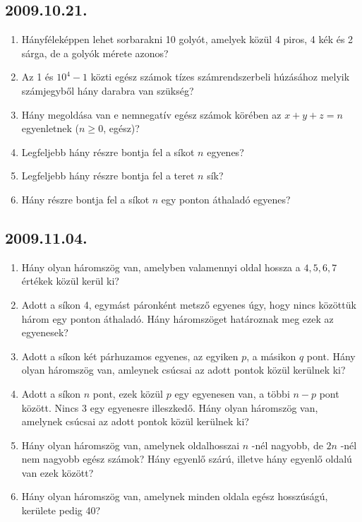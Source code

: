 \documentclass{article}
\begin{document}
\subsection*{2009.10.21.}
\begin{enumerate}
\item Hányféleképpen lehet sorbarakni 10 golyót, amelyek közül 4 piros, 4 kék és 2 sárga, de a golyók mérete azonos?
\item Az 1 és $10^4-1$ közti egész számok tízes számrendszerbeli húzásához melyik számjegyből hány darabra van szükség?
\item Hány megoldása van e nemnegatív egész számok körében az $x+y+z=n$ egyenletnek ($n\geq 0$, egész)?
\item Legfeljebb hány részre bontja fel a síkot $n$ egyenes?
\item Legfeljebb hány részre bontja fel a teret $n$ sík?
\item Hány részre bontja fel a síkot $n$ egy ponton áthaladó egyenes?
\end{enumerate}

\subsection*{2009.11.04.}
\begin{enumerate}
\item Hány olyan háromszög van, amelyben valamennyi oldal hossza a $4,5,6,7$ értékek közül kerül ki?
\item Adott a síkon 4, egymást páronként metsző egyenes úgy, hogy nincs közöttük három egy ponton áthaladó. Hány háromszöget határoznak meg ezek az egyenesek?
\item Adott a síkon két párhuzamos egyenes, az egyiken $p$, a másikon $q$ pont. Hány olyan háromszög van, amleynek csúcsai az adott pontok közül kerülnek ki?
\item Adott a síkon $n$ pont, ezek közül $p$ egy egyenesen van, a többi $n-p$ pont között. Nincs 3 egy egyenesre illeszkedő. Hány olyan háromszög van, amelynek csúcsai az adott pontok közül kerülnek ki?
\item Hány olyan háromszög van, amelynek oldalhosszai $n$ -nél nagyobb, de $2n$ -nél nem nagyobb egész számok? Hány egyenlő szárú, illetve hány egyenlő oldalú van ezek között?
\item Hány olyan háromszög van, amelynek minden oldala egész hosszúságú, kerülete pedig 40?
\end{enumerate}
\end{document}
